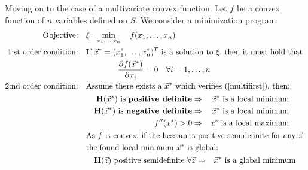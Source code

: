 \documentclass[../convex_optimization.tex]{subfiles}
\begin{document}
Moving on to the case of a multivariate convex function.
Let $f$ be a convex function of $n$ variables defined on $S$.
We consider a minimization program:
\begin{align}
    \text{Objective:} &\quad\xi\colon \min_{x_1,\ldots,x_n}
    \quad f(x_1, \ldots, x_n)
    \nonumber\\
    \text{1:st order condition:} &\quad
    \text{If $\vec{x}^*=(x_1^*, \ldots, x_n^*)^T$ is a solution to $\xi$,
    then it must hold that }
    \nonumber\\& \qquad \qquad \quad
    \begin{aligned}
        \frac{\partial f(\vec{x}^*)}{\partial x_i} = 0\label{multifirst}
        \quad \forall i=1,\ldots , n
    \end{aligned}\\
    \text{2:nd order condition:} &\quad
    \text{Assume there exists a $\vec{x}^*$ which verifies (\ref{multifirst}), then:}
    \nonumber\\ & \qquad
    \begin{aligned}
        \mathbf H(\vec{x}^*) \text{ is \textbf{positive definite}}
        &\Rightarrow & \vec{x}^*\text{ is a local minimum}\\
        \mathbf H(\vec{x}^*) \text{ is \textbf{negative definite}}
        &\Rightarrow & \vec{x}^*\text{ is a local minimum}\\
        f''(x^*) > 0 &\Rightarrow & x^* \text{ is a local maximum}
    \end{aligned}\\
    &\quad
    \text{As $f$ is convex, if the hessian is positive semidefinite for
any $\vec{z}$}\nonumber \\ & \quad
    \text{the found local minimum $\vec{x}^*$ is global:}
    \nonumber\\ & \qquad
    \begin{aligned}
        \mathbf H(\vec{z}) \text{ positive semidefinite } \forall \vec{z}
        & \Rightarrow & \vec{x}^*\text{ is a global minimum}
    \end{aligned}
\end{align}



\newpage
\end{document}
